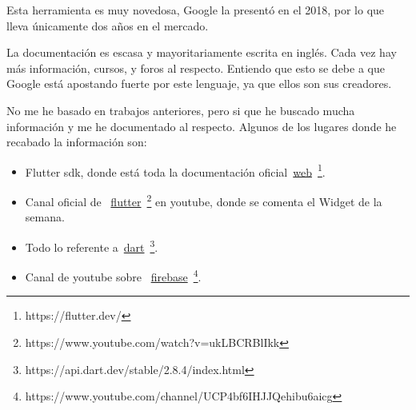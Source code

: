 
Esta herramienta es muy novedosa, Google la presentó en el 2018, por lo que lleva únicamente dos años en el mercado.

La documentación es escasa y mayoritariamente escrita en inglés. Cada vez hay más información, cursos, y foros al respecto. Entiendo que esto se debe a que Google está apostando fuerte por este lenguaje, ya que ellos son sus creadores.

No me he basado en trabajos anteriores, pero si que he buscado mucha información y me he documentado al respecto. Algunos de los lugares donde he recabado la información son:


\begin{itemize}
	\item Flutter sdk, donde está toda la documentación oficial~\href{https://flutter.dev/}{web}~\footnote{https://flutter.dev/}.
	\item Canal oficial de  ~\href{https://www.youtube.com/watch?v=ukLBCRBlIkk&list=PLjxrf2q8roU1kMpfyJ4EY0pID2oRHtvGm}{flutter}~\footnote{https://www.youtube.com/watch?v=ukLBCRBlIkk} en youtube, donde se comenta el Widget de la semana.
	\item Todo lo referente a~\href{https://api.dart.dev/stable/2.8.4/index.html}{dart}~\footnote{https://api.dart.dev/stable/2.8.4/index.html}.
	\item Canal de youtube sobre ~\href{https://www.youtube.com/channel/UCP4bf6IHJJQehibu6ai__cg}{firebase}~\footnote{https://www.youtube.com/channel/UCP4bf6IHJJQehibu6aicg}.
\end{itemize}